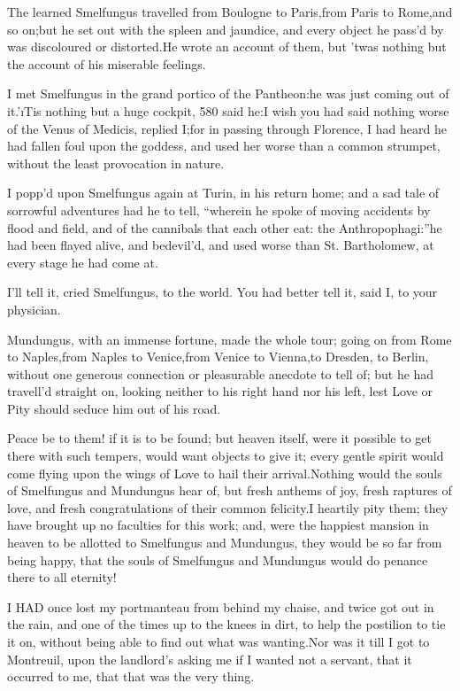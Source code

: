 \documentclass[twoside]{article}
\begin{document}
The learned Smelfungus travelled from Boulogne to Paris,\tsk from Paris to
Rome,\tsk and so on;\tsk but he set out with the spleen and jaundice, and every
object he pass’d by was discoloured or distorted.\tsk He wrote an account of
them, but ’twas nothing but the account of his miserable feelings.

I met Smelfungus in the grand portico of the Pantheon:\tsk he was just coming
out of it.\tsk ’\i{Tis nothing but a huge cockpit}, {580} said he:\tsk I wish you
had said nothing worse of the Venus of Medicis, replied I;\tsk for in passing
through Florence, I had heard he had fallen foul upon the goddess, and
used her worse than a common strumpet, without the least provocation in
nature.

I popp’d upon Smelfungus again at Turin, in his return home; and a sad
tale of sorrowful adventures had he to tell, “wherein he spoke of moving
accidents by flood and field, and of the cannibals that each other eat:
the Anthropophagi:”\tsk he had been flayed alive, and bedevil’d, and used
worse than St. Bartholomew, at every stage he had come at.\tsk 

\tsk I’ll tell it, cried Smelfungus, to the world.  You had better tell it,
said I, to your physician.

Mundungus, with an immense fortune, made the whole tour; going on from
Rome to Naples,\tsk from Naples to Venice,\tsk from Venice to Vienna,\tsk to Dresden,
to Berlin, without one generous connection or pleasurable anecdote to
tell of; but he had travell’d straight on, looking neither to his right
hand nor his left, lest Love or Pity should seduce him out of his road.

Peace be to them! if it is to be found; but heaven itself, were it
possible to get there with such tempers, would want objects to give it;
every gentle spirit would come flying upon the wings of Love to hail
their arrival.\tsk Nothing would the souls of Smelfungus and Mundungus hear
of, but fresh anthems of joy, fresh raptures of love, and fresh
congratulations of their common felicity.\tsk I heartily pity them; they have
brought up no faculties for this work; and, were the happiest mansion in
heaven to be allotted to Smelfungus and Mundungus, they would be so far
from being happy, that the souls of Smelfungus and Mundungus would do
penance there to all eternity!






I HAD once lost my portmanteau from behind my chaise, and twice got out
in the rain, and one of the times up to the knees in dirt, to help the
postilion to tie it on, without being able to find out what was
wanting.\tsk Nor was it till I got to Montreuil, upon the landlord’s asking
me if I wanted not a servant, that it occurred to me, that that was the
very thing.
\end{document}
